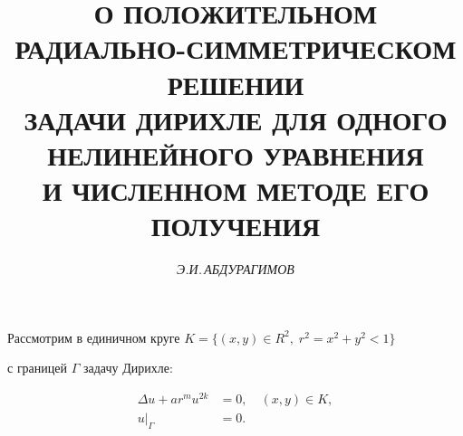 

 




 


\newcommand{\ovl}{\overline} 


\newcommand{\const}{\operatorname{const}} 




\renewcommand{\baselinestretch}{1.10} 


\setcounter{page}{3} 








\author{\it Э.И.\,АБДУРАГИМОВ} 


\title{О ПОЛОЖИТЕЛЬНОМ РАДИАЛЬНО-СИММЕТРИЧЕСКОМ РЕШЕНИИ\\ 


ЗАДАЧИ ДИРИХЛЕ ДЛЯ ОДНОГО НЕЛИНЕЙНОГО УРАВНЕНИЯ \\ 


И ЧИСЛЕННОМ МЕТОДЕ ЕГО ПОЛУЧЕНИЯ} 


 


\date{} 


\pagestyle{plain} 


 


 


\maketitle 


 


Рассмотрим в единичном круге $K=\{(x,y)\in R^2,\;r^2=x^2+y^2<1\}$ 


с границей $\Gamma$ задачу Дирихле: 


\begin{align*} 


\Delta u+ar^mu^{2k} &=0,\quad (x,y)\in K,\tag{1}\\ 


u|_\Gamma &=0. \tag{2}


\end{align*} 


